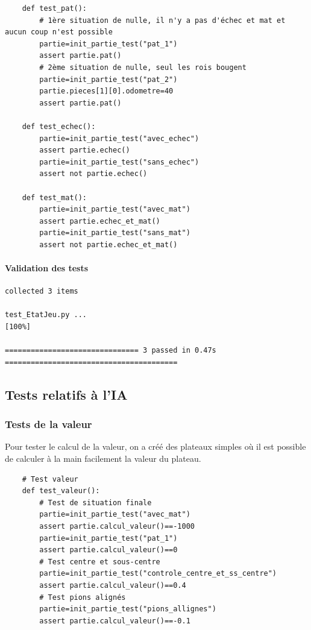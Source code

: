 \documentclass{article}
\begin{document}
\begin{verbatim}
    def test_pat():
        # 1ère situation de nulle, il n'y a pas d'échec et mat et aucun coup n'est possible
        partie=init_partie_test("pat_1")
        assert partie.pat()
        # 2ème situation de nulle, seul les rois bougent
        partie=init_partie_test("pat_2")
        partie.pieces[1][0].odometre=40
        assert partie.pat()
        
    def test_echec():
        partie=init_partie_test("avec_echec")
        assert partie.echec()
        partie=init_partie_test("sans_echec")
        assert not partie.echec()
    
    def test_mat():
        partie=init_partie_test("avec_mat")
        assert partie.echec_et_mat()
        partie=init_partie_test("sans_mat")
        assert not partie.echec_et_mat()
\end{verbatim}

\paragraph{Validation des tests}
\begin{verbatim}
collected 3 items

test_EtatJeu.py ...                                                                                                                                                  [100%]

=============================== 3 passed in 0.47s ======================================== 
\end{verbatim}

\subsection{Tests relatifs à l'IA}
\subsubsection{Tests de la valeur} 
Pour tester le calcul de la valeur, on a créé des plateaux simples où il est possible de calculer à la main facilement la valeur du plateau.

\begin{verbatim}
    # Test valeur
    def test_valeur():
        # Test de situation finale
        partie=init_partie_test("avec_mat")
        assert partie.calcul_valeur()==-1000
        partie=init_partie_test("pat_1")
        assert partie.calcul_valeur()==0
        # Test centre et sous-centre
        partie=init_partie_test("controle_centre_et_ss_centre")
        assert partie.calcul_valeur()==0.4
        # Test pions alignés
        partie=init_partie_test("pions_allignes")
        assert partie.calcul_valeur()==-0.1
\end{verbatim}
\end{document}
